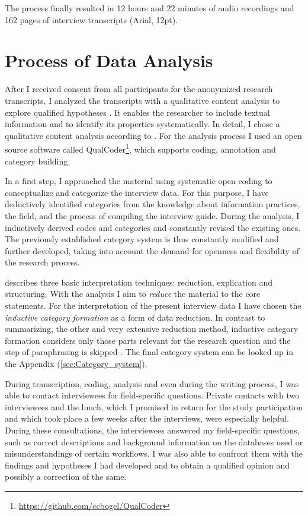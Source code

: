 \documentclass[12pt, a4paper, titlepage, oneside, abstract=true, toc=listof, toc=bibliography, BCOR=1cm]{scrreprt}
\begin{document}
The process finally resulted in 12 hours and 22 minutes of audio recordings and 162 pages of interview transcripts (Arial, 12pt). 

\section{Process of Data Analysis}
After I received consent from all participants for the anonymized research transcripts, I analyzed the transcripts with a qualitative content analysis to explore qualified hypotheses \citep{Kohlbacher2006, Krippendorff2012, Mayring2000, Mayring2014}. It enables the researcher to include textual information and to identify its properties systematically. In detail, I chose a qualitative content analysis according to \citet{Mayring2014}. For the analysis process I used an open source software called QualCoder\footnote{\url{https://github.com/ccbogel/QualCoder}}, which supports coding, annotation and category building. 

In a first step, I approached the material using systematic open coding \citep{Corbin1990} to conceptualize and categorize the interview data. For this purpose, I have deductively identified categories from the knowledge about information practices, the field, and the process of compiling the interview guide. During the analysis, I inductively derived codes and categories and constantly revised the existing ones. The previously established category system is thus constantly modified and further developed, taking into account the demand for openness and flexibility of the research process. 

\citet[p. 65]{Mayring2014} describes three basic interpretation techniques: reduction, explication and structuring. With the analysis I aim to \textit{reduce} the material to the core statements. For the interpretation of the present interview data I have chosen the \textit{inductive category formation} as a form of data reduction. In contrast to summarizing, the other and very extensive reduction method, inductive category formation considers only those parts relevant for the research question and the step of paraphrasing is skipped \cite[p. 79]{Mayring2014}. The final category system can be looked up in the Appendix (\ref{sec:Category_system}).

During transcription, coding, analysis and even during the writing process, I was able to contact interviewees for field-specific questions. Private contacts with two interviewees and the lunch, which I promised in return for the study participation and which took place a few weeks after the interviews, were especially helpful. During these consultations, the interviewees answered my field-specific questions, such as correct descriptions and background information on the databases used or misunderstandings of certain workflows. I was also able to confront them with the findings and hypotheses I had developed and to obtain a qualified opinion and possibly a correction of the same.
	
\end{document}
